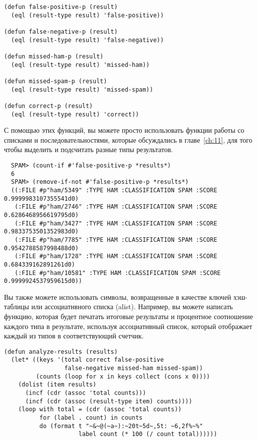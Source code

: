 \begin{lstlisting}
(defun false-positive-p (result)
  (eql (result-type result) 'false-positive))

(defun false-negative-p (result)
  (eql (result-type result) 'false-negative))

(defun missed-ham-p (result)
  (eql (result-type result) 'missed-ham))

(defun missed-spam-p (result)
  (eql (result-type result) 'missed-spam))

(defun correct-p (result)
  (eql (result-type result) 'correct))
\end{lstlisting}

С помощью этих функций, вы можете просто использовать функции работы со списками и
последовательностями, которые обсуждались в главе~\ref{ch:11}, для того чтобы выделить и
подсчитать разные типы результатов.

\begin{verbatim}
  SPAM> (count-if #'false-positive-p *results*)
  6
  SPAM> (remove-if-not #'false-positive-p *results*)
  ((:FILE #p"ham/5349" :TYPE HAM :CLASSIFICATION SPAM :SCORE 0.9999983107355541d0)
   (:FILE #p"ham/2746" :TYPE HAM :CLASSIFICATION SPAM :SCORE 0.6286468956619795d0)
   (:FILE #p"ham/3427" :TYPE HAM :CLASSIFICATION SPAM :SCORE 0.9833753501352983d0)
   (:FILE #p"ham/7785" :TYPE HAM :CLASSIFICATION SPAM :SCORE 0.9542788587998488d0)
   (:FILE #p"ham/1728" :TYPE HAM :CLASSIFICATION SPAM :SCORE 0.684339162891261d0)
   (:FILE #p"ham/10581" :TYPE HAM :CLASSIFICATION SPAM :SCORE 0.9999924537959615d0))
\end{verbatim}

Вы также можете использовать символы, возвращенные  в качестве ключей
хэш-таблицы или ассоциативного списка (alist).  Например, вы можете написать функцию,
которая будет печатать итоговые результаты и процентное соотношение каждого типа в
результате, используя ассоциативный список, который отображает каждый из типов в
соответствующий счетчик.

\begin{lstlisting}
(defun analyze-results (results)
  (let* ((keys '(total correct false-positive 
                 false-negative missed-ham missed-spam))
         (counts (loop for x in keys collect (cons x 0))))
    (dolist (item results)
      (incf (cdr (assoc 'total counts)))
      (incf (cdr (assoc (result-type item) counts))))
    (loop with total = (cdr (assoc 'total counts))
          for (label . count) in counts
          do (format t "~&~@(~a~):~20t~5d~,5t: ~6,2f%~%"
                     label count (* 100 (/ count total))))))
\end{lstlisting}


